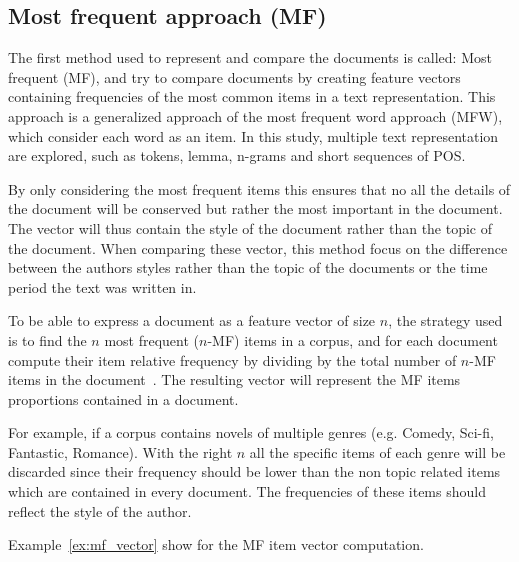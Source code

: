 \subsection{Most frequent approach (MF)}

The first method used to represent and compare the documents is called: Most frequent (MF), and try to compare documents by creating feature vectors containing frequencies of the most common items in a text representation.
This approach is a generalized approach of the most frequent word approach (MFW), which consider each word as an item.
In this study, multiple text representation are explored, such as tokens, lemma, n-grams and short sequences of POS.

By only considering the most frequent items this ensures that no all the details of the document will be conserved but rather the most important in the document.
The vector will thus contain the style of the document rather than the topic of the document.
When comparing these vector, this method focus on the difference between the authors styles rather than the topic of the documents or the time period the text was written in.

To be able to express a document as a feature vector of size $n$, the strategy used is to find the $n$ most frequent ($n$-MF) items in a corpus, and for each document compute their item relative frequency by dividing by the total number of $n$-MF items in the document~\cite{savoy_stylo}.
The resulting vector will represent the MF items proportions contained in a document.

For example, if a corpus contains novels of multiple genres (e.g. Comedy, Sci-fi, Fantastic, Romance).
With the right $n$ all the specific items of each genre will be discarded since their frequency should be lower than the non topic related items which are contained in every document.
The frequencies of these items should reflect the style of the author.

Example~\ref{ex:mf_vector} show for the MF item vector computation.

